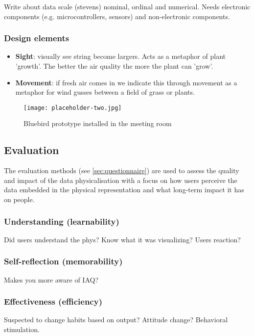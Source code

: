 Write about data scale (stevens) nominal, ordinal and numerical. Needs electronic components (e.g. microcontrollers, sensors) and non-electronic components.

\subsubsection{Design elements}

\begin{itemize}
  \item \textbf{Sight}: visually see string become largers. Acts as a metaphor of plant 'growth'. The better the air quality the more the plant can 'grow'.
  \item \textbf{Movement}: if fresh air comes in we indicate this through movement as a metaphor for wind gusses between a field of grass or plants.
\end{itemize}

\begin{figure}[H]
    \centering
    \texttt{[image: placeholder-two.jpg]}
    \caption{Bluebird prototype installed in the meeting room}
    \label{fig:complexity}
\end{figure}

\subsection{Evaluation}
\label{sec:evaluation_results}

The evaluation methods (see \ref{sec:questionnaire}) are used to assess the quality and impact of the data physicalisation with a focus on how users perceive the data embedded in the physical representation and what long-term impact it has on people.


\subsubsection{Understanding (learnability)}

Did users understand the phys? Know what it was visualizing? Users reaction?

\subsubsection{Self-reflection (memorability)}

Makes you more aware of IAQ?

\subsubsection{Effectiveness (efficiency)}

Suspected to change habits based on output? Attitude change? Behavioral stimulation.



